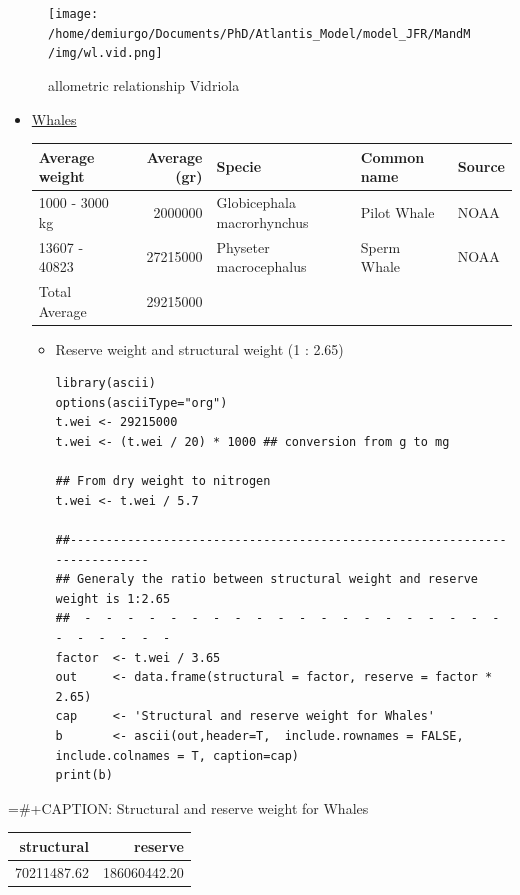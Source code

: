 \documentclass[11pt]{article}
\begin{document}
\begin{itemize}
       \begin{figure}[htb]
       \centering
       \texttt{[image: /home/demiurgo/Documents/PhD/Atlantis\_Model/model\_JFR/MandM/img/wl.vid.png]}
       \caption{allometric relationship Vidriola}
       \end{figure}


\begin{itemize}
\item \underline{Whales}

\begin{center}
\begin{tabular}{lrlll}
 Average weight  &  Average (gr)  &  Specie                      &  Common name  &  Source  \\
\hline
 1000 - 3000 kg  &       2000000  &  Globicephala macrorhynchus  &  Pilot Whale  &  NOAA    \\
 13607 - 40823   &      27215000  &  Physeter macrocephalus      &  Sperm Whale  &  NOAA    \\
\hline
 Total Average   &      29215000  &                              &               &          \\
\end{tabular}
\end{center}


\begin{itemize}
\item Reserve weight and structural weight (1 : 2.65)

\begin{verbatim}
library(ascii)
options(asciiType="org")
t.wei <- 29215000
t.wei <- (t.wei / 20) * 1000 ## conversion from g to mg

## From dry weight to nitrogen
t.wei <- t.wei / 5.7

##--------------------------------------------------------------------------
## Generaly the ratio between structural weight and reserve weight is 1:2.65
##  -  -  -  -  -  -  -  -  -  -  -  -  -  -  -  -  -  -  -  -  -  -  -  -  -  -
factor  <- t.wei / 3.65
out     <- data.frame(structural = factor, reserve = factor * 2.65)
cap     <- 'Structural and reserve weight for Whales'
b       <- ascii(out,header=T,  include.rownames = FALSE, include.colnames = T, caption=cap)
print(b)
\end{verbatim}
\end{itemize}
\end{itemize}
=\#+CAPTION: Structural and reserve weight for Whales

\begin{center}
\begin{tabular}{rr}
  structural  &       reserve  \\
\hline
 70211487.62  &  186060442.20  \\
\end{tabular}
\end{center}



\end{itemize}
\end{document}
